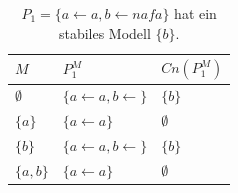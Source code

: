 \begin{table}
    \centering
        \begin{tabularx}{0.5\textwidth}{l|X|l}
            $M$             & $P_1^M$                               & $Cn(P_1^M)$  \\
            \hline
            $\emptyset$     & $\{ a \leftarrow a, b \leftarrow \}$  & $\{ b \}$     \\
            $\{ a \}$       & $\{ a \leftarrow a \}$                & $\emptyset$   \\
            $\{ b \}$       & $\{ a \leftarrow a, b \leftarrow \}$  & $\{ b \}$     \\
            $\{ a, b \}$    & $\{ a \leftarrow a \}$                & $\emptyset$   \\
        \end{tabularx}
    \caption[$P_1 = \{ a \leftarrow a, b \leftarrow naf a \}$ hat ein stabiles Modell.]{$P_1 = \{ a \leftarrow a, b \leftarrow naf a \}$ hat ein stabiles Modell $\{ b \}$.}
    \label{tab:Ein_stabiles_Modell}
\end{table}



